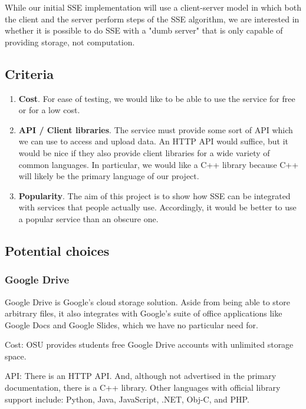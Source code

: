 While our initial SSE implementation will use a client-server model in which both the client and the server perform steps of the SSE algorithm, we are interested in whether it is possible to do SSE with a "dumb server" that is only capable of providing storage, not computation.

\subsection{ Criteria }

\begin{enumerate}
  \item \textbf{Cost}.
  For ease of testing, we would like to be able to use the service for free or for a low cost.

  \item \textbf{API / Client libraries}.
  The service must provide some sort of API which we can use to access and upload data. An HTTP API would suffice, but it would be nice if they also provide client libraries for a wide variety of common languages. In particular, we would like a C++ library because C++ will likely be the primary language of our project.

  \item \textbf{Popularity}.
  The aim of this project is to show how SSE can be integrated with services that people actually use.
  Accordingly, it would be better to use a popular service than an obscure one.
\end{enumerate}

\subsection{ Potential choices }
\subsubsection{ Google Drive }

Google Drive is Google's cloud storage solution. Aside from being able to store arbitrary files, it also integrates with Google's suite of office applications like Google Docs and Google Slides, which we have no particular need for.

Cost: OSU provides students free Google Drive accounts with unlimited storage space.

API: There is an HTTP API.
And, although not advertised in the primary documentation, there is a C++ library. \cite{drivecpp}
Other languages with official library support include:  Python, Java, JavaScript, .NET, Obj-C, and PHP.
\cite{driveapi}

